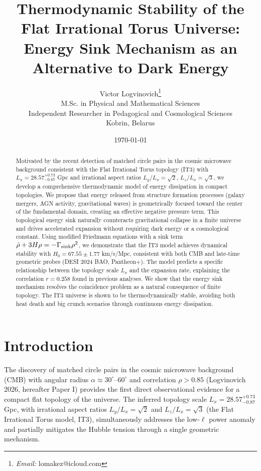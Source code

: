 \documentclass[12pt,a4paper]{article}
\title{\textbf{Thermodynamic Stability of the Flat Irrational Torus Universe:}\\ Energy Sink Mechanism as an Alternative to Dark Energy}
\author{Victor Logvinovich\thanks{\textit{Email:} lomakez@icloud.com}\\
M.Sc. in Physical and Mathematical Sciences\\
Independent Researcher in Pedagogical and Cosmological Sciences\\
Kobrin, Belarus}
\date{\today}
\begin{document}
\maketitle

\begin{abstract}
Motivated by the recent detection of matched circle pairs in the cosmic microwave background consistent with the Flat Irrational Torus topology (IT3) with $L_x = 28.57^{+0.73}_{-0.87}$ Gpc and irrational aspect ratios $L_y/L_x = \sqrt{2}$, $L_z/L_x = \sqrt{3}$, we develop a comprehensive thermodynamic model of energy dissipation in compact topologies. We propose that energy released from structure formation processes (galaxy mergers, AGN activity, gravitational waves) is geometrically focused toward the center of the fundamental domain, creating an effective negative pressure term. This topological energy sink naturally counteracts gravitational collapse in a finite universe and drives accelerated expansion without requiring dark energy or a cosmological constant. Using modified Friedmann equations with a sink term $\dot{\rho} + 3H\rho = -\Gamma_{\rm sink}\rho^2$, we demonstrate that the IT3 model achieves dynamical stability with $H_0 = 67.55 \pm 1.77$ km/s/Mpc, consistent with both CMB and late-time geometric probes (DESI 2024 BAO, Pantheon+). The model predicts a specific relationship between the topology scale $L_x$ and the expansion rate, explaining the correlation $r = 0.258$ found in previous analyses. We show that the energy sink mechanism resolves the coincidence problem as a natural consequence of finite topology. The IT3 universe is shown to be thermodynamically stable, avoiding both heat death and big crunch scenarios through continuous energy dissipation.
\end{abstract}

\section{Introduction}

The discovery of matched circle pairs in the cosmic microwave background (CMB) with angular radius $\alpha \approx 30^\circ\text{--}60^\circ$ and correlation $\rho > 0.85$ (Logvinovich 2026, hereafter Paper I) provides the first direct observational evidence for a compact flat topology of the universe. The inferred topology scale $L_x = 28.57^{+0.73}_{-0.87}$ Gpc, with irrational aspect ratios $L_y/L_x = \sqrt{2}$ and $L_z/L_x = \sqrt{3}$ (the Flat Irrational Torus model, IT3), simultaneously addresses the low-$\ell$ power anomaly and partially mitigates the Hubble tension through a single geometric mechanism.
\end{document}
